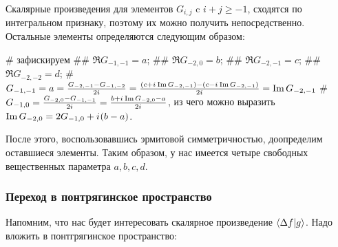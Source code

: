 Скалярные произведения для элементов $G_{i, j}$ c $i + j \ge -1$, сходятся по интегральном признаку, поэтому их можно получить непосредственно. Остальные элементы определяются следующим образом:

\begin{elist}
# зафискируем
## $\Re G_{-1, -1} = a$;
## $\Re G_{-2, 0} = b$;
## $\Re G_{-2, -1} = c$;
## $\Re G_{-2, -2} = d$;
# $G_{-1, -1} = a = \frac{G_{-2, -1} - G_{-1, -2}}{2 {i\mkern1mu}} = \frac{(c + {i\mkern1mu} \Im G_{-2, -1}) - (c - {i\mkern1mu} \Im G_{-2, -1})}{2 {i\mkern1mu}} = \Im G_{-2, -1}$
# $G_{-1, 0} = \frac{G_{-2, 0} - G_{-1, -1}}{2 {i\mkern1mu}} = \frac{b + {i\mkern1mu} \Im G_{-2, 0} - a}{2 {i\mkern1mu}}$, из чего можно выразить $\Im G_{-2, 0} = 2 G_{-1, 0} + {i\mkern1mu} (b - a)$.
\end{elist}

После этого, воспользовавшись эрмитовой симметричностью, доопределим оставшиеся элементы. Таким образом, у нас имеется четыре свободных вещественных параметра $a, b, c, d$. 

\subsubsection{Переход в понтрягинское пространство}

Напомним, что нас будет интересовать скалярное произведение $\ip{\Delta f}{g}$. Надо вложить в понтгрягинское пространство:

